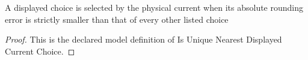 \begin{definition}
  \label{def:physics:phyx-mini-0978:phyxminiproblems-problemphyxmini0978-isuniquenearestdisplayedcurrentchoice}
  A displayed choice is selected by the physical current when its absolute rounding error is strictly smaller than that of every other listed choice
\end{definition}
\begin{proof}
  This is the declared model definition of Is Unique Nearest Displayed Current Choice.
\end{proof}
